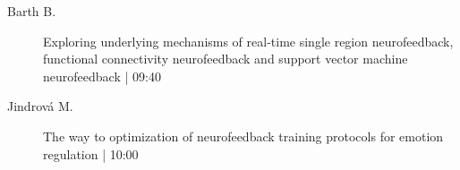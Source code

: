 \begin{symposium}
\begin{description}
                \item [ Barth B.] Exploring underlying mechanisms of real-time single region neurofeedback, functional connectivity neurofeedback and support vector machine neurofeedback \textcolor{mygray}{ | 09:40}    
                
                \item [ Jindrová M.] The way to optimization of neurofeedback training protocols for emotion regulation \textcolor{mygray}{ | 10:00}    
                
            \end{description} 
            \end{symposium}
            